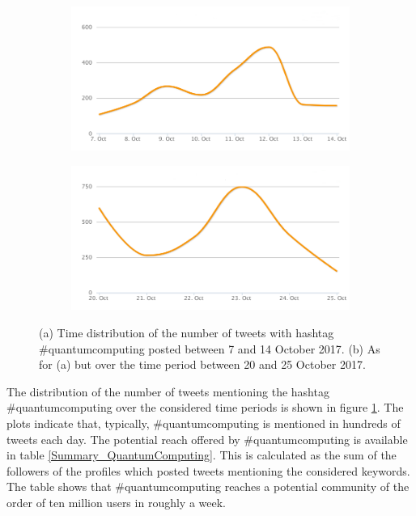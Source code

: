 \begin{figure}
 \centering
 \begin{subfigure}[t]{0.9\textwidth}
   \includegraphics[width=1\linewidth]{Images/FirstSearch_QuantumComputing.png}
   \caption{} 
 \end{subfigure}

 \begin{subfigure}[t]{0.9\textwidth}
   \includegraphics[width=1\linewidth]{Images/SecondSearch_QuantumComputing.png}
   \caption{}
 \end{subfigure}
 \caption{(a) Time distribution of the number of tweets with hashtag \#quantumcomputing posted between 7 and 14 October 2017. (b) As for (a) but over the time period between 20 and 25 October 2017.} 
 \label{First-SecondSearch_QuantumComputing}
\end{figure}

The distribution of the number of tweets mentioning the hashtag \#quantumcomputing over the considered time periods is shown in figure \ref{First-SecondSearch_QuantumComputing}. The plots indicate that, typically, \#quantumcomputing is mentioned in hundreds of tweets each day. The potential reach offered by \#quantumcomputing is available in table \ref{Summary_QuantumComputing}. This is calculated as the sum of the followers of the profiles which posted tweets mentioning the considered keywords. The table shows that \#quantumcomputing reaches a potential community of the order of ten million users in roughly a week.

